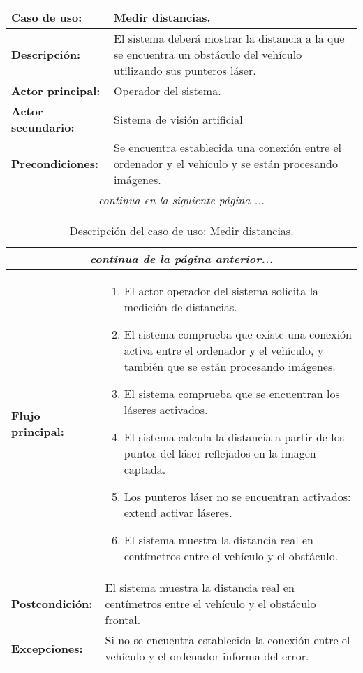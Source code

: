 \begin{table}[H]
  \begin{center}
    \begin{tabular}{|p{3.5cm}|p{10cm}|}
      \hline
      {\textbf{Caso de uso:}} & { Medir distancias.} \\
      \hline
      {\textbf{Descripción:}} & {El sistema deberá mostrar la distancia a la que se encuentra un obstáculo del vehículo utilizando sus punteros láser.} \\
     \hline
      {\textbf{Actor principal:}} & { Operador del sistema.} \\
      \hline
      {\textbf{Actor secundario:}} & {Sistema de visión artificial}\\
      \hline
      {\textbf{Precondiciones:}} & { Se encuentra establecida una conexión entre el ordenador y el vehículo y se están procesando imágenes.} \\
     \hline 
     \multicolumn{2}{c}{\emph{continua en la siguiente página ...}}\\
    \end{tabular}
  \end{center}
\end{table}    

\begin{table}[H]
  \begin{center}
    \begin{tabular}{|p{3.5cm}|p{10cm}|}
     \multicolumn{2}{c}{\emph{continua de la página anterior...}}\\
     \hline
     {\textbf{Flujo principal:}} & { 
       \begin{enumerate}
       \item El actor operador del sistema solicita la medición de distancias.
       \item El sistema comprueba que existe una conexión activa entre el ordenador y el vehículo, y también que se están
         procesando imágenes.
       \item El sistema comprueba que se encuentran los láseres activados.
       \item El sistema calcula la distancia a partir de los puntos del láser reflejados en la imagen captada.
       \item Los punteros láser no se encuentran activados: extend activar láseres.
       \item El sistema muestra la distancia real en centímetros entre el vehículo y el obstáculo.
       \end{enumerate}
     } \\
     \hline
     {\textbf{Postcondición:}} & { El sistema muestra la distancia real en centímetros entre el vehículo y el obstáculo frontal.}\\
     \hline
     {\textbf{Excepciones:}} & {Si no se encuentra establecida la conexión entre el vehículo y el ordenador informa del error.}\\        
     \hline
    \end{tabular}
  \end{center}
\caption{Descripción del caso de uso: Medir distancias.}
\end{table}


